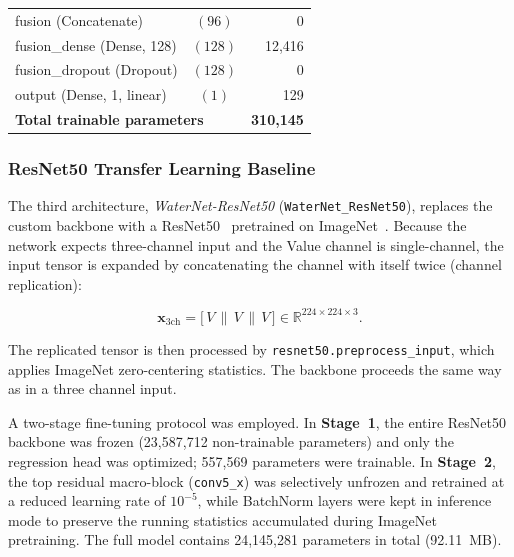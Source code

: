 \begin{table}[htbp]
\begin{center}
\begin{tabular}{|l|c|r|}
        \hline
        fusion (Concatenate)
            & $(96)$ & 0 \\
        fusion\_dense (Dense, 128)
            & $(128)$ & 12{,}416 \\
        fusion\_dropout (Dropout)
            & $(128)$ & 0 \\
        output (Dense, 1, linear)
            & $(1)$ & 129 \\
        \hline
        \multicolumn{2}{|l|}{\textbf{Total trainable parameters}}
            & \textbf{310{,}145} \\
        \hline
        \end{tabular}
    \label{tab:wn_fuslite_arch}
    \end{center}
\end{table}

\subsubsection{ResNet50 Transfer Learning Baseline}
\label{subsubsec:resnet50}

The third architecture, \textit{WaterNet-ResNet50} (\texttt{WaterNet\_ResNet50}), replaces the custom backbone with a ResNet50~\cite{resnet50} pretrained on ImageNet~\cite{imagenet}. Because the network expects three-channel input and the Value channel is single-channel, the input tensor is expanded by concatenating the channel with itself twice (channel replication):

\begin{equation}
    \mathbf{x}_{3\text{ch}} =
        \bigl[\,V \,\|\, V \,\|\, V\,\bigr] \in \mathbb{R}^{224\times224\times3}.
    \label{eq:channel_rep}
\end{equation}

\noindent The replicated tensor is then processed by \texttt{resnet50.preprocess\_input}, which applies ImageNet zero-centering statistics. The backbone proceeds the same way as in a three channel input.

A two-stage fine-tuning protocol was employed. In \textbf{Stage~1}, the entire ResNet50 backbone was frozen (23{,}587{,}712 non-trainable parameters) and only the regression head was optimized; 557{,}569 parameters were trainable. In \textbf{Stage~2}, the top residual macro-block (\texttt{conv5\_x}) was selectively unfrozen and retrained at a reduced learning rate of $10^{-5}$, while BatchNorm layers were kept in inference mode to preserve the running statistics accumulated during ImageNet pretraining. The full model contains 24{,}145{,}281 parameters in total (92.11~MB).

